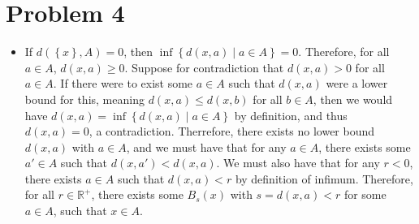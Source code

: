 \documentclass[11pt, letterpaper]{article}
\begin{document}
\section*{Problem 4}
\begin{itemize}
	\item If $d(\left\{ x \right\} ,A)=0$, then $\inf \left\{ d(x,a)\mid a\in A \right\} =0$. Therefore, for all $a\in A$, $d(x,a)\geq 0$. Suppose for contradiction that $d(x,a)>0$ for all $a\in A$. If there were to exist some $a\in A$ such that $d(x,a)$ were a lower bound for this, meaning $d(x,a)\leq d(x,b)$ for all $b\in A$, then we would have $d(x,a)=\inf \left\{ d(x,a)\mid a\in A \right\} $ by definition, and thus $d(x,a)=0$, a contradiction. Therrefore, there exists no lower bound $d(x,a)$ with $a\in A$, and we must have that for any $a\in A$, there exists some $a'\in A$ such that $d(x,a')<d(x,a)$. We must also have that for any $r<0$, there exists $a\in A$ such that $d(x,a)<r$ by definition of infimum. Therefore, for all $r\in\mathbb{R} ^+$, there exists some $B_s(x)$ with $s=d(x,a)<r$ for some $a\in A$, such that $x\in A$.


\end{itemize}
\end{document}
